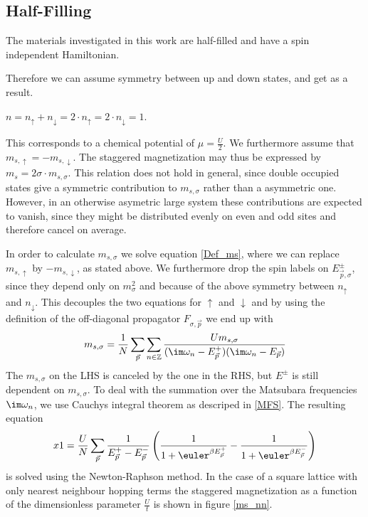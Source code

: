 \documentclass[a4paper,10pt]{report}
\begin{document}
\subsection{Half-Filling}

The materials investigated in this work are half-filled and have a spin independent Hamiltonian.

Therefore we can assume symmetry between up and down states, and get as a result.



$n=n_{\uparrow}+n_{\downarrow}=2\cdot n_{\uparrow}= 2\cdot n_{\downarrow} = 1$.

This corresponds to a chemical potential of 
$\mu=\frac{U}2$.
We furthermore assume that $m_{s,\uparrow}=-m_{s,\downarrow}$. 
The staggered magnetization may thus be expressed by $m_s=2\sigma \cdot m_{s,\sigma}$.
This relation does not hold in general, since double occupied states give a symmetric contribution to $m_{s,\sigma}$ rather than a asymmetric one.
However, in an otherwise asymetric large system these contributions are expected to vanish, since they might be distributed evenly on even and odd sites 
and therefore cancel on average.

In order to calculate $m_ {s,\sigma}$ we solve equation \ref{Def_ms}, where we can replace $m_{s,\uparrow}$ by $-m_{s,\downarrow}$, as stated above.
We furthermore drop the spin labels on $E_{\vec p,\sigma}^{\pm}$, since they depend only on $m_{\sigma}^2$ and because of the above symmetry between $n_{\uparrow}$ and $n_{\downarrow}$.
This decouples the two equations for $\uparrow$ and $\downarrow$ and by using the definition of the off-diagonal propagator $F_{\sigma,\vec{p}}$ we end up with
\begin{equation}
 m_{s,\sigma} = \frac1N \sum_{\vec{p}} \sum_{n\in \mathbb{Z}} 
							      \frac { Um_{s,\sigma} }
								    { (\im \omega_n - E_{\vec{p}}^+) (\im \omega_n - E_{\vec{p}})}
\end{equation}
The $m_{s,\sigma}$ on the LHS is canceled by the one in the RHS, but $E^{\pm}$ is still dependent on $m_{s,\sigma}$.
To deal with the summation over the Matsubara frequencies $\im \omega_n$, we use Cauchys integral theorem as descriped in \ref{MFS}.
The resulting equation
\begin{equation}x
 1= \frac{U}{N}\sum_{\vec{p}} \frac{1}{E_{\vec p}^+ - E_{\vec{p}}^-} \left( \frac{1}{1+\euler^{\beta E_{\vec p}^+}} - \frac{1}{1+\euler^{\beta E_{\vec p}^-}} \right)
\end{equation}
is solved using the Newton-Raphson method.
In the case of a square lattice with only nearest neighbour hopping terms the staggered magnetization as a function of the dimensionless parameter $\frac{U}{t}$ is shown in figure
\ref{ms_nn}.
\end{document}
